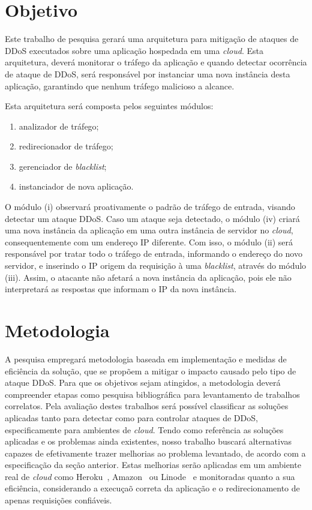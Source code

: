 \documentclass[a4paper, 11pt]{article}
\begin{document}
\section{Objetivo}
Este trabalho de pesquisa gerar\'a uma arquitetura para mitigação de ataques de
DDoS executados sobre uma aplicação hospedada em uma \emph{cloud}. Esta
arquitetura, dever\'a monitorar o tr\'afego da aplica\c{c}\~{a}o e quando
detectar
ocorrência de ataque de DDoS, ser\'a respons\'avel por instanciar uma nova instância desta
aplica\c{c}\~{a}o, garantindo que nenhum tr\'afego malicioso a alcance.

Esta arquitetura será composta pelos seguintes módulos:
\begin{enumerate}[i]
  \item analizador de tráfego;
  \item redirecionador de tráfego;
  \item gerenciador de \emph{blacklist};
  \item instanciador de nova aplica\c{c}\~{a}o.
\end{enumerate}  

O módulo (i) observará proativamente o padrão de tráfego de entrada, visando
detectar um ataque DDoS. Caso um ataque seja detectado, o m\'odulo (iv) criará uma nova
instância da aplicação em uma outra instância de servidor no \emph{cloud}, consequentemente com um endereço IP diferente.
Com isso, o módulo (ii) será responsável por tratar todo o tráfego de
entrada, informando o endereço do novo servidor, e inserindo o IP origem da
requisição à uma \emph{blacklist}, através do módulo (iii). Assim, o
atacante não afetará a nova instância da aplicação, pois ele não interpretará as
respostas que informam o IP da nova instância.


\section{Metodologia}
A pesquisa empregar\'a metodologia baseada em implementa\c{c}\~{a}o e medidas de
efici\^encia da solu\c{c}\~{a}o, que se propõem a mitigar o impacto causado pelo
tipo de ataque DDoS. Para que os objetivos sejam atingidos, a metodologia dever\'a
compreender etapas como pesquisa bibliogr\'afica para levantamento de trabalhos
correlatos. Pela avalia\c{c}\~{a}o destes trabalhos ser\'a poss\'ivel
classificar as
solu\c{c}\~oes aplicadas tanto para detectar como para controlar ataques de
DDoS,
especificamente para ambientes de \emph{cloud}. Tendo como refer\^encia as
solu\c{c}\~oes aplicadas e os problemas ainda existentes, nosso trabalho
buscar\'a
alternativas capazes de efetivamente trazer melhorias ao problema levantado,
de acordo com a especificação da seção anterior.
Estas melhorias ser\~ao aplicadas em um ambiente real de \emph{cloud} como
Heroku~\cite{heroku}, Amazon~\cite{amazon}
ou Linode~\cite{linode} e monitoradas quanto a sua efici\^encia, considerando a
execu\c{c}a\~o correta da aplica\c{c}\~{a}o e o redirecionamento de apenas requisições
confi\'aveis.
\end{document}
